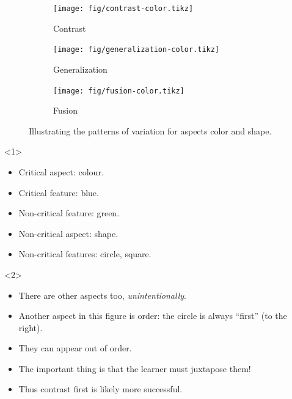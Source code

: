 \begin{frame}\label<1>{vtsummary}
  \begin{figure}
    \begin{subfigure}{0.3\columnwidth}
      \centering
      \texttt{[image: fig/contrast-color.tikz]}
      \caption{Contrast}
    \end{subfigure}
    \hfill
    \begin{subfigure}{0.3\columnwidth}
      \centering
      \texttt{[image: fig/generalization-color.tikz]}
      \caption{Generalization}
    \end{subfigure}
    \hfill
    \begin{subfigure}{0.3\columnwidth}
      \centering
      \texttt{[image: fig/fusion-color.tikz]}
      \caption{Fusion}
    \end{subfigure}
    \caption{%
      Illustrating the patterns of variation for aspects color and shape.
    }
  \end{figure}

  \begin{onlyenv}<1>
    \begin{example}
      \begin{itemize}
        \item Critical aspect: colour.
        \item Critical feature: blue.
        \item Non-critical feature: green.
        \item Non-critical aspect: shape.
        \item Non-critical features: circle, square.
      \end{itemize}
    \end{example}
  \end{onlyenv}
  \begin{onlyenv}<2>
    \begin{remark}
      \begin{itemize}
        \item There are other aspects too, \emph{unintentionally}.
        \item Another aspect in this figure is order: the circle is always 
          \enquote{first} (to the right).
      \end{itemize}
    \end{remark}
  \end{onlyenv}
\end{frame}

\begin{frame}
  \begin{remark}
    \begin{itemize}
      \item They can appear out of order.
      \item The important thing is that the learner must juxtapose them!
      \item Thus contrast first is likely more successful.
    \end{itemize}
  \end{remark}
\end{frame}

